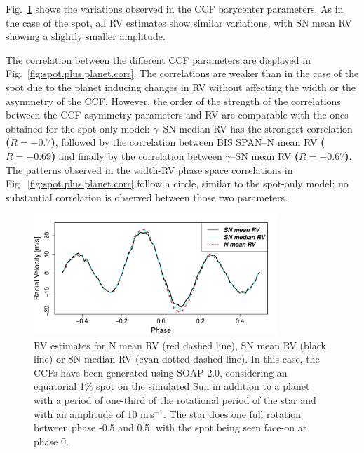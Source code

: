 \documentclass{aa}
\def\ms{\hbox{\,m\,s$^{-1}$}}         %
\begin{document}
Fig.~\ref{fig:spot.plus.planet} shows the variations observed in the CCF barycenter parameters. As in the case of the spot, all RV estimates show similar variations, with SN mean RV showing a slightly smaller amplitude.

The correlation between the different CCF parameters are displayed in Fig.~\ref{fig:spot.plus.planet.corr}. 
The correlations are weaker than in the case of the spot due to the planet inducing changes in RV without affecting the width or the asymmetry of the CCF.  However, the order of the strength of the correlations between the CCF asymmetry parameters and RV are comparable with the ones obtained for the spot-only model: $\gamma$--SN median RV has the strongest correlation {\bf{($R=-0.7$)}}, followed by the correlation between BIS SPAN--N mean RV {\bf{($R=-0.69$)}} and finally by the correlation between $\gamma$--SN mean RV {\bf{($R=-0.67$)}}. 
The patterns observed in the width-RV phase space correlations in Fig.~\ref{fig:spot.plus.planet.corr} follow a circle, similar to the spot-only model; no substantial correlation is observed between those two parameters.

\begin{figure}[htbp]
\begin{center}
\includegraphics[width = 3.6in]{RV_comparison_SPOTandPLANET_withNoise.pdf} 
 \caption{RV estimates for N mean RV (red dashed line),  SN mean RV (black line) or SN median RV (cyan dotted-dashed line). In this case, the CCFs have been generated using SOAP 2.0, considering an equatorial 1\% spot on the simulated Sun in addition to a planet with a period of one-third of the rotational period of the star and with an amplitude of 10\,\ms. The star does one full rotation between phase -0.5 and 0.5, with the spot being seen face-on at phase 0.}
    \label{fig:spot.plus.planet}
\end{center}
\end{figure}
\end{document}
